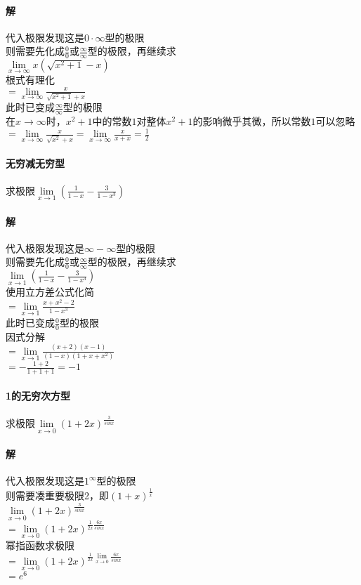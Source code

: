 \documentclass{article}
\begin{document}
\begin{flushleft}
	\paragraph{解}
	代入极限发现这是$0\cdot\infty$型的极限\\
	则需要先化成$\frac{0}{0}$或$\frac{\infty}{\infty}$型的极限，再继续求\\
	$\lim\limits_{x\to \infty}x(\sqrt{x^2+1}-x)$\\
	根式有理化\\
	$=\lim\limits_{x\to \infty}\frac{x}{\sqrt{x^2+1}+x}$\\
	此时已变成$\frac{\infty}{\infty}$型的极限\\
	在$x\to\infty$时，$x^2+1$中的常数$1$对整体$x^2+1$的影响微乎其微，所以常数$1$可以忽略\\
	$=\lim\limits_{x\to \infty}\frac{x}{\sqrt{x^2}+x}
	=\lim\limits_{x\to \infty}\frac{x}{x+x}=\frac{1}{2}$\\
	
	\paragraph{无穷减无穷型}
	求极限$\lim\limits_{x\to 1}(\frac{1}{1-x}-\frac{3}{1-x^3})$
	\paragraph{解}
	代入极限发现这是$\infty-\infty$型的极限\\
	则需要先化成$\frac{0}{0}$或$\frac{\infty}{\infty}$型的极限，再继续求\\
	$\lim\limits_{x\to 1}(\frac{1}{1-x}-\frac{3}{1-x^3})$\\
	使用立方差公式化简\\
	$=\lim\limits_{x\to 1}\frac{x+x^2-2}{1-x^3}$\\
	此时已变成$\frac{0}{0}$型的极限\\
	因式分解\\
	$=\lim\limits_{x\to 1}\frac{(x+2)(x-1)}{(1-x)(1+x+x^2)}$\\
	$=-\frac{1+2}{1+1+1}=-1$\\
	
	\paragraph{1的无穷次方型}
	求极限$\lim\limits_{x\to 0}(1+2x)^{\frac{3}{sinx}}$
	\paragraph{解}
	代入极限发现这是$1^\infty$型的极限\\
	则需要凑重要极限2，即$(1+x)^{\frac{1}{x}}$\\
	$\lim\limits_{x\to 0}(1+2x)^{\frac{3}{sinx}}$\\
	$=\lim\limits_{x\to 0}(1+2x)^{\frac{1}{2x}\frac{6x}{sinx}}$\\
	幂指函数求极限\\
	$=\lim\limits_{x\to 0}(1+2x)^{\frac{1}{2x}\lim\limits_{x\to 0}\frac{6x}{sinx}}$\\
	$=e^6$\\


\end{flushleft}
\end{document}
